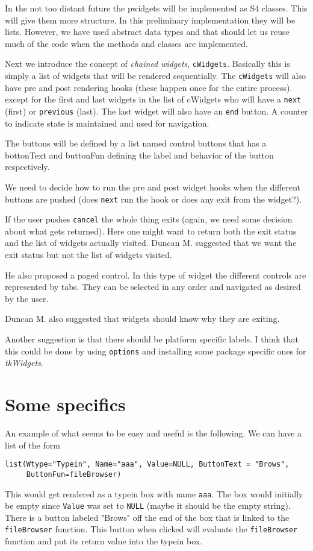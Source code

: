 \documentclass{article}
\begin{document}
In the not too distant future the pwidgets will be implemented as S4
classes. This will give them more structure. In this preliminary
implementation they will be lists. However, we have used
abstract data types and that should let us reuse much of the
code when the methods and classes are implemented.

Next we introduce the concept of {\em chained widgets},
\verb+cWidgets+. Basically this is simply a list of widgets that will
be rendered sequentially. The \verb+cWidgets+ will also have pre and
post rendering hooks (these happen once for the entire
process). except for the first and last widgets in the list of
cWidgets who will have a \verb+next+ (first) or \verb+previous+
(last). The last widget will also have an \verb+end+ button. A counter
to indicate state is maintained and used for navigation.  

The buttons will be defined by a list named control buttons that has a
bottonText and buttonFun defining the label and behavior of the button
respectively.  

We need to decide how to run the pre and post widget hooks when the
different buttons are pushed (does \verb+next+ run the hook or does
any exit from the widget?).

If the user pushes \verb+cancel+ the whole thing exits (again, we need
some decision about what gets returned). Here one might want to return
both the exit status and the list of widgets actually visited.
Duncan M. suggested that we want the exit status but not the list of
widgets visited.

He also proposed a paged control. In this type of widget the different
controls are represented by tabs. They can be selected in any order
and navigated as desired by the user.

Duncan M. also suggested that widgets should know why they are
exiting.

Another suggestion is that there should be platform specific labels.
I think that this could be done by using \verb+options+ and installing
some package specific ones for {\em tkWidgets}.

\section*{Some specifics}

An example of what seems to be easy and useful is the following.
We can have a list of the form
\begin{verbatim}
list(Wtype="Typein", Name="aaa", Value=NULL, ButtonText = "Brows",
     ButtonFun=fileBrowser) 
\end{verbatim}
This would get rendered as a typein box with name \verb+aaa+. The box
would initially be empty since \verb+Value+ was set to \verb+NULL+
(maybe it should be the empty string). There is a button labeled
"Brows" off the end of the box that is linked to the
\verb+fileBrowser+ function. This button when clicked will evaluate
the \verb+fileBrowser+ function and put its return value into the
typein box. 
\end{document}
